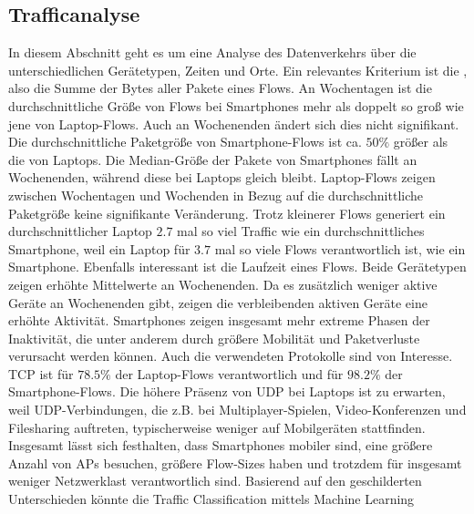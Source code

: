 \documentclass[12pt, a4paper]{article}
\begin{document}
\vfill
\pagebreak

\subsection{Trafficanalyse}

In diesem Abschnitt geht es um eine Analyse des Datenverkehrs über die unterschiedlichen Gerätetypen,
Zeiten und Orte. Ein relevantes Kriterium ist die , also die Summe der Bytes aller Pakete eines Flows.
An Wochentagen ist die durchschnittliche Größe von Flows bei Smartphones mehr als doppelt so groß wie jene von Laptop-Flows.
Auch an Wochenenden ändert sich dies nicht signifikant. Die durchschnittliche Paketgröße von Smartphone-Flows ist ca. $50 \%$ größer
als die von Laptops. Die Median-Größe der Pakete von Smartphones fällt an Wochenenden, während diese bei Laptops gleich bleibt.
Laptop-Flows zeigen zwischen Wochentagen und Wochenden in Bezug auf die durchschnittliche Paketgröße keine signifikante Veränderung.
\newline\newline
Trotz kleinerer Flows generiert ein durchschnittlicher Laptop $2.7$ mal so viel Traffic wie ein durchschnittliches Smartphone,
weil ein Laptop für $3.7$ mal so viele Flows verantwortlich ist, wie ein Smartphone.
\newline\newline
Ebenfalls interessant ist die Laufzeit eines Flows. Beide Gerätetypen zeigen erhöhte Mittelwerte an Wochenenden.
Da es zusätzlich weniger aktive Geräte an Wochenenden gibt, zeigen die verbleibenden aktiven Geräte eine erhöhte Aktivität.
Smartphones zeigen insgesamt mehr extreme Phasen der Inaktivität, die unter anderem durch größere Mobilität und Paketverluste
verursacht werden können.\newline
Auch die verwendeten Protokolle sind von Interesse. TCP ist für $78.5 \%$ der Laptop-Flows verantwortlich
und für $98.2 \%$ der Smartphone-Flows. Die höhere Präsenz von UDP bei Laptops ist zu erwarten, weil
UDP-Verbindungen, die z.B. bei Multiplayer-Spielen, Video-Konferenzen und Filesharing auftreten,
typischerweise weniger auf Mobilgeräten stattfinden.
Insgesamt lässt sich festhalten, dass Smartphones mobiler sind, eine größere Anzahl von APs besuchen,
größere Flow-Sizes haben und trotzdem für insgesamt weniger Netzwerklast verantwortlich sind.
\newline\newline
Basierend auf den geschilderten Unterschieden könnte die Traffic Classification mittels Machine Learning
\end{document}
